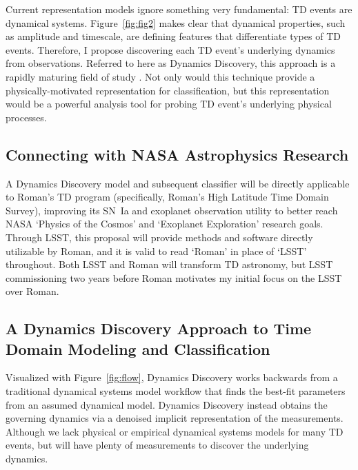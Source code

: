 \documentclass[modern]{aastex631}
\begin{document}
Current representation models ignore something very fundamental: TD events are dynamical systems. 
Figure~\ref{fig:fig2} makes clear that dynamical properties, such as amplitude and timescale, are defining features that differentiate types of TD events. 
Therefore, I propose discovering each TD event's underlying dynamics from observations. 
Referred to here as Dynamics Discovery, this approach is a rapidly maturing field of study \citep{Mai2016,Raissi2018,Goyal2022}. 
Not only would this technique provide a physically-motivated representation for classification, but this representation would be a powerful analysis tool for probing TD event's underlying physical processes. 

\subsection{Connecting with NASA Astrophysics Research}
A Dynamics Discovery model and subsequent classifier will be directly applicable to Roman's TD program (specifically, Roman's High Latitude Time Domain Survey), improving its SN~Ia and exoplanet observation utility to better reach NASA `Physics of the Cosmos' and `Exoplanet Exploration' research goals.
Through LSST, this proposal will provide methods and software directly utilizable by Roman, and it is valid to read `Roman' in place of `LSST' throughout.
Both LSST and Roman will transform TD astronomy, but LSST commissioning two years before Roman motivates my initial focus on the LSST over Roman.  

\subsection{A Dynamics Discovery Approach to Time Domain Modeling and Classification}
Visualized with Figure~\ref{fig:flow}, Dynamics Discovery works backwards from a traditional dynamical systems model workflow that finds the best-fit parameters from an assumed dynamical model.
Dynamics Discovery instead obtains the governing dynamics via a denoised implicit representation of the measurements. 
Although we lack physical or empirical dynamical systems models for many TD events, but will have plenty of measurements to discover the underlying dynamics.
\begin{figure*}
    \caption{}
    \label{fig:flow}
\end{figure*}
\end{document}
